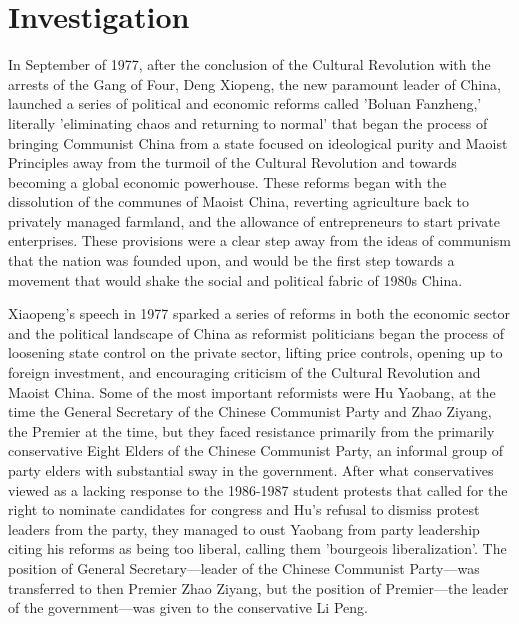 \documentclass{paper}
\begin{document}
\section{Investigation}
In September of 1977, after the conclusion of the Cultural Revolution with the arrests of the Gang of Four, Deng Xiopeng, the new paramount leader of China, launched a series of political and economic reforms called 'Boluan Fanzheng,' literally 'eliminating chaos and returning to normal' that began the process of bringing Communist China from a state focused on ideological purity and Maoist Principles away from the turmoil of the Cultural Revolution and towards becoming a global economic powerhouse. These reforms began with the dissolution of the communes of Maoist China, reverting agriculture back to privately managed farmland, and the allowance of entrepreneurs to start private enterprises. These provisions were a clear step away from the ideas of communism that the nation was founded upon, and would be the first step towards a movement that would shake the social and political fabric of 1980s China.

Xiaopeng's speech in 1977 sparked a series of reforms in both the economic sector and the political landscape of China as reformist politicians began the process of loosening state control on the private sector, lifting price controls, opening up to foreign investment, and encouraging criticism of the Cultural Revolution and Maoist China. Some of the most important reformists were Hu Yaobang, at the time the General Secretary of the Chinese Communist Party and Zhao Ziyang, the Premier at the time, but they faced resistance primarily from the primarily conservative Eight Elders of the Chinese Communist Party, an informal group of party elders with substantial sway in the government. After what conservatives viewed as a lacking response to the 1986-1987 student protests that called for the right to nominate candidates for congress and Hu's refusal to dismiss protest leaders from the party, they managed to oust Yaobang from party leadership citing his reforms as being too liberal, calling them 'bourgeois liberalization'. The position of General Secretary---leader of the Chinese Communist Party---was transferred to then Premier Zhao Ziyang, but the position of Premier---the leader of the government---was given to the conservative Li Peng.
\end{document}
